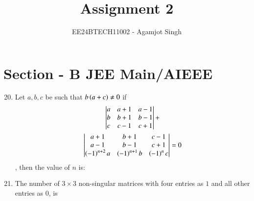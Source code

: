 \documentclass[journal,12pt,twocolumn]{IEEEtran}
\theoremstyle{remark}
\begin{document}

\vspace{3cm}

\title{Assignment 2}
\author{EE24BTECH11002 - Agamjot Singh}
\maketitle
\newpage
\bigskip

\renewcommand{\thefigure}{\theenumi}
\renewcommand{\thetable}{\theenumi}
\section*{Section - B JEE Main/AIEEE}
\begin{enumerate}
    \setcounter{enumi}{19}

    \item Let $a,b,c$ be such that $b\left(a+c\right)\neq0$ if
	\begin{multline*}
		\begin{vmatrix}
			a & a+1 & a-1\\
			b & b+1 & b-1\\
			c & c-1 & c+1\\
		\end{vmatrix}
		+\\
		\begin{vmatrix}
			a+1 & b+1 & c-1\\
			a-1 & b-1 & c+1\\
			\left(-1\right)^{n+2}a & \left(-1\right)^{n+1}b & \left(-1\right)^{n}c\\
		\end{vmatrix}	
		= 0
	\end{multline*},
		then the value of $n$ is:
	\hfill{}
	\begin{enumerate}

	\end{enumerate}

    \item The number of $3\times3$ non-singular matrices with four entries as $1$ and all other entries as $0$, is 
	\hfill{}{\par}



\end{enumerate}
\end{document}
